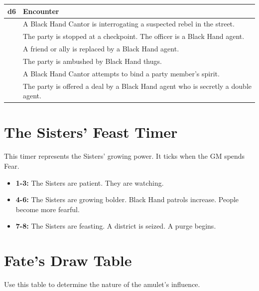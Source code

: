 \documentclass[11pt,twoside]{book}
\begin{document}
\begin{tabularx}{\textwidth}{>{\centering\arraybackslash}p{} X}
\toprule
\textbf{d6} & \textbf{Encounter} \\
\midrule
1 & A Black Hand Cantor is interrogating a suspected rebel in the street. \\
2 & The party is stopped at a checkpoint. The officer is a Black Hand agent. \\
3 & A friend or ally is replaced by a Black Hand agent. \\
4 & The party is ambushed by Black Hand thugs. \\
5 & A Black Hand Cantor attempts to bind a party member's spirit. \\
6 & The party is offered a deal by a Black Hand agent who is secretly a double agent. \\
\bottomrule
\end{tabularx}

\section{The Sisters' Feast Timer}

This timer represents the Sisters' growing power. It ticks when the GM spends Fear.

\begin{itemize}
    \item \textbf{1-3:} The Sisters are patient. They are watching.
    \item \textbf{4-6:} The Sisters are growing bolder. Black Hand patrols increase. People become more fearful.
    \item \textbf{7-8:} The Sisters are feasting. A district is seized. A purge begins.
\end{itemize}

\section{Fate's Draw Table}

Use this table to determine the nature of the amulet's influence.
\end{document}
